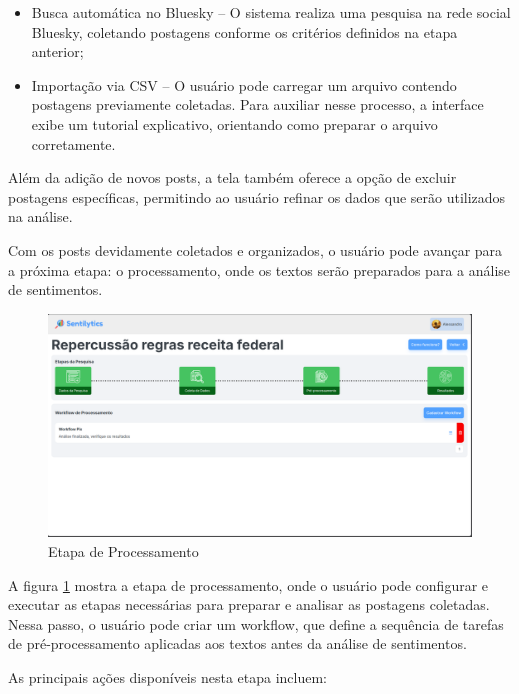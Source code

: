 \documentclass[
	12pt,				%
	oneside,			%
	a4paper,			%
	english,			%
	french,				%
	spanish,			%
	brazil				%
	]{abntex2}
\begin{document}
\begin{itemize}
\tightlist
\item
  Busca automática no Bluesky -- O sistema realiza uma pesquisa na rede
  social Bluesky, coletando postagens conforme os critérios definidos na
  etapa anterior;
\item
  Importação via CSV -- O usuário pode carregar um arquivo contendo
  postagens previamente coletadas. Para auxiliar nesse processo, a
  interface exibe um tutorial explicativo, orientando como preparar o
  arquivo corretamente.
\end{itemize}

Além da adição de novos posts, a tela também oferece a opção de excluir
postagens específicas, permitindo ao usuário refinar os dados que serão
utilizados na análise.

Com os posts devidamente coletados e organizados, o usuário pode avançar
para a próxima etapa: o processamento, onde os textos serão preparados
para a análise de sentimentos.

\begin{figure}[htbp]
\hypertarget{tela_processamento}{%
\caption{Etapa de Processamento}\label{tela_processamento}
\begin{center}
\includegraphics[scale=0.2]{imagens/sentilytics/interface-grafica/processamento.png}
\end{center}
}
\end{figure}

A figura \ref{tela_processamento} mostra a etapa de processamento, onde
o usuário pode configurar e executar as etapas necessárias para preparar
e analisar as postagens coletadas. Nessa passo, o usuário pode criar um
workflow, que define a sequência de tarefas de pré-processamento
aplicadas aos textos antes da análise de sentimentos.

As principais ações disponíveis nesta etapa incluem:
\end{document}
